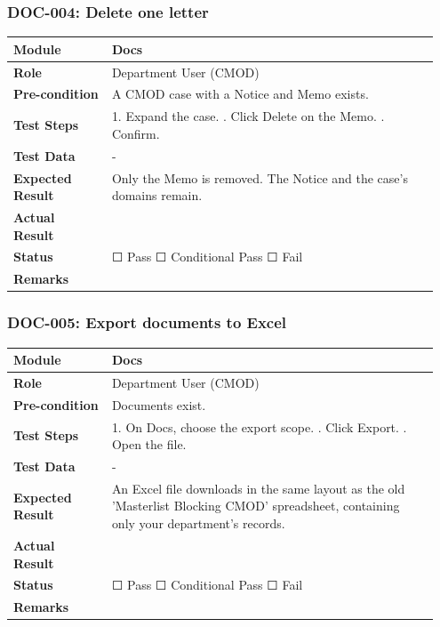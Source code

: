 \documentclass[10pt]{article}
\begin{document}
\subsubsection*{DOC-004: Delete one letter}
\begin{longtable}{p{0.22\linewidth}p{0.73\linewidth}}
\hline
\textbf{Module} & Docs \\ \hline
\textbf{Role} & Department User (CMOD) \\ \hline
\textbf{Pre-condition} & A CMOD case with a Notice and Memo exists. \\ \hline
\textbf{Test Steps} & 1. Expand the case. \newline 2. Click Delete on the Memo. \newline 3. Confirm. \\ \hline
\textbf{Test Data} & - \\ \hline
\textbf{Expected Result} & Only the Memo is removed. The Notice and the case's domains remain. \\ \hline
\textbf{Actual Result} & \newline \newline \\ \hline
\textbf{Status} & ☐ Pass \quad ☐ Conditional Pass \quad ☐ Fail \\ \hline
\textbf{Remarks} & \newline \\ \hline
\end{longtable}
\subsubsection*{DOC-005: Export documents to Excel}
\begin{longtable}{p{0.22\linewidth}p{0.73\linewidth}}
\hline
\textbf{Module} & Docs \\ \hline
\textbf{Role} & Department User (CMOD) \\ \hline
\textbf{Pre-condition} & Documents exist. \\ \hline
\textbf{Test Steps} & 1. On Docs, choose the export scope. \newline 2. Click Export. \newline 3. Open the file. \\ \hline
\textbf{Test Data} & - \\ \hline
\textbf{Expected Result} & An Excel file downloads in the same layout as the old 'Masterlist Blocking CMOD' spreadsheet, containing only your department's records. \\ \hline
\textbf{Actual Result} & \newline \newline \\ \hline
\textbf{Status} & ☐ Pass \quad ☐ Conditional Pass \quad ☐ Fail \\ \hline
\textbf{Remarks} & \newline \\ \hline
\end{longtable}
\end{document}
